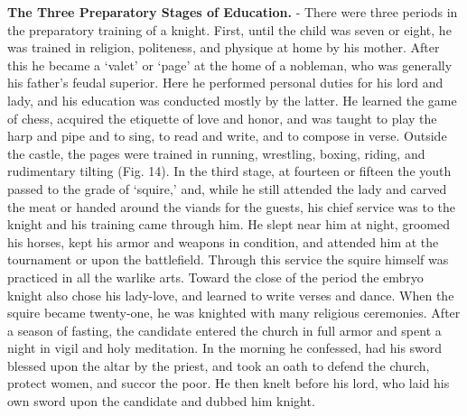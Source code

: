 \documentclass[
]{book}
\begin{document}
\textbf{The Three Preparatory Stages of Education.} - There were three periods in the preparatory training of a knight. First, until the child was seven or eight, he was trained in religion, politeness, and physique at home by his mother. After this he became a `valet' or `page' at the home of a nobleman, who was generally his father's feudal superior. Here he performed personal duties for his lord and lady, and his education was conducted mostly by the latter. He learned the game of chess, acquired the etiquette of love and honor, and was taught to play the harp and pipe and to sing, to read and write, and to compose in verse. Outside the castle, the pages were trained in running, wrestling, boxing, riding, and rudimentary tilting (Fig. 14). In the third stage, at fourteen or fifteen the youth passed to the grade of `squire,' and, while he still attended the lady and carved the meat or handed around the viands for the guests, his chief service was to the knight and his training came through him. He slept near him at night, groomed his horses, kept his armor and weapons in condition, and attended him at the tournament or upon the battlefield. Through this service the squire himself was practiced in all the warlike arts. Toward the close of the period the embryo knight also chose his lady-love, and learned to write verses and dance. When the squire became twenty-one, he was knighted with many religious ceremonies. After a season of fasting, the candidate entered the church in full armor and spent a night in vigil and holy meditation. In the morning he confessed, had his sword blessed upon the altar by the priest, and took an oath to defend the church, protect women, and succor the poor. He then knelt before his lord, who laid his own sword upon the candidate and dubbed him knight.
\end{document}
